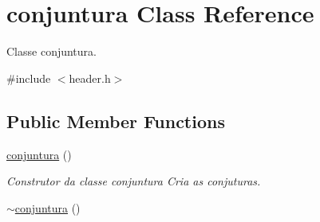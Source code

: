 \hypertarget{classconjuntura}{}\section{conjuntura Class Reference}
\label{classconjuntura}


Classe conjuntura.  




{\ttfamily \#include $<$header.\+h$>$}

\subsection*{Public Member Functions}
\begin{DoxyCompactItemize}
\item 
\hyperlink{classconjuntura_af63277766a70ebce6534ec77c2f32eb9}{conjuntura} ()\hypertarget{classconjuntura_af63277766a70ebce6534ec77c2f32eb9}{}\label{classconjuntura_af63277766a70ebce6534ec77c2f32eb9}

\begin{DoxyCompactList}\small\item\em Construtor da classe conjuntura Cria as conjuturas. \end{DoxyCompactList}\item 
\hyperlink{classconjuntura_adc088f0e6f70c07c041533ac0b24c692}{$\sim$conjuntura} ()\hypertarget{classconjuntura_adc088f0e6f70c07c041533ac0b24c692}{}\label{classconjuntura_adc088f0e6f70c07c041533ac0b24c692}


\end{DoxyCompactItemize}
